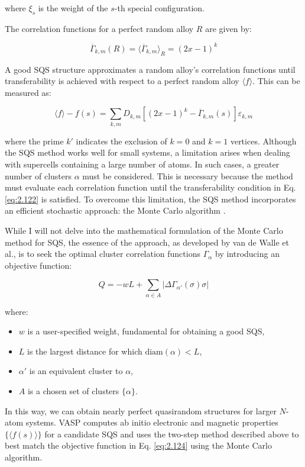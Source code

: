 where \(\xi_s\) is the weight of the \(s\)-th special configuration.

The correlation functions for a perfect random alloy \(R\) are given by:

\begin{equation}
	\overline{\Gamma}_{k,m}(R) = \langle \overline{\Gamma}_{k,m} \rangle_R = (2x-1)^{k}
	\label{eq.2.121}
\end{equation}

A good SQS structure approximates a random alloy's correlation functions until transferability is achieved with respect to a perfect random alloy \(\langle f \rangle\). This can be measured as:

\begin{equation}
	\langle f \rangle - f(s) = \sum_{k,m} D_{k,m} \left[ (2x-1)^{k} - \overline{\Gamma}_{k,m}(s) \right] \varepsilon_{k,m}
	\label{eq:2.122}
\end{equation}

where the prime \(k'\) indicates the exclusion of \(k = 0\) and \(k = 1\) vertices. Although the SQS method works well for small systems, a limitation arises when dealing with supercells containing a large number of atoms. In such cases, a greater number of clusters \(\alpha\) must be considered. This is necessary because the method must evaluate each correlation function until the transferability condition in Eq. \ref{eq:2.122} is satisfied. To overcome this limitation, the SQS method incorporates an efficient stochastic approach: the Monte Carlo algorithm \supercite{atat5}.

While I will not delve into the mathematical formulation of the Monte Carlo method for SQS, the essence of the approach, as developed by van de Walle et al., is to seek the optimal cluster correlation functions \(\Gamma_\alpha\) by introducing an objective function:

\begin{equation}
	Q = - w L + \sum_{\alpha \in A} \left| \Delta \Gamma_{\alpha'}(\sigma)\sigma \right|
	\label{eq:2.124}
\end{equation}

where:
\begin{itemize}
	\item \(w\) is a user-specified weight, fundamental for obtaining a good SQS,
	\item \(L\) is the largest distance for which \(\text{diam}(\alpha) < L\),
	\item \(\alpha'\) is an equivalent cluster to \(\alpha\),
	\item \(A\) is a chosen set of clusters \(\{ \alpha \}\).
\end{itemize}

In this way, we can obtain nearly perfect quasirandom structures for larger \(N\)-atom systems. VASP computes ab initio electronic and magnetic properties \(\{ \langle f(s) \rangle \}\) for a candidate SQS and uses the two-step method described above to best match the objective function in Eq. \ref{eq:2.124} using the Monte Carlo algorithm.

